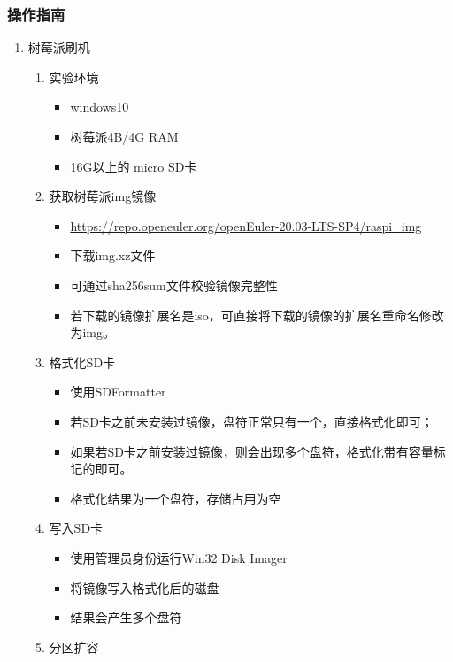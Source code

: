 \documentclass{article}
\begin{document}
\subsubsection{操作指南}
\begin{enumerate}
	\item 树莓派刷机
	      \begin{enumerate}
		      \item 实验环境
		            \begin{itemize}
			            \item windows10
			            \item 树莓派4B/4G RAM
			            \item 16G以上的 micro SD卡
		            \end{itemize}
		      \item 获取树莓派img镜像
		            \begin{itemize}
			            \item \url{https://repo.openeuler.org/openEuler-20.03-LTS-SP4/raspi_img}
			            \item 下载img.xz文件
			            \item 可通过sha256sum文件校验镜像完整性
			            \item 若下载的镜像扩展名是iso，可直接将下载的镜像的扩展名重命名修改为img。
		            \end{itemize}
		      \item 格式化SD卡
		            \begin{itemize}
			            \item 使用SDFormatter
			            \item 若SD卡之前未安装过镜像，盘符正常只有一个，直接格式化即可；
			            \item 如果若SD卡之前安装过镜像，则会出现多个盘符，格式化带有容量标记的即可。
			            \item 格式化结果为一个盘符，存储占用为空
		            \end{itemize}
		      \item 写入SD卡
		            \begin{itemize}
			            \item 使用管理员身份运行Win32 Disk Imager
			            \item 将镜像写入格式化后的磁盘
			            \item 结果会产生多个盘符
		            \end{itemize}
		      \item 分区扩容
		            \begin{itemize}

\end{itemize}
\end{enumerate}
\end{enumerate}
\end{document}
